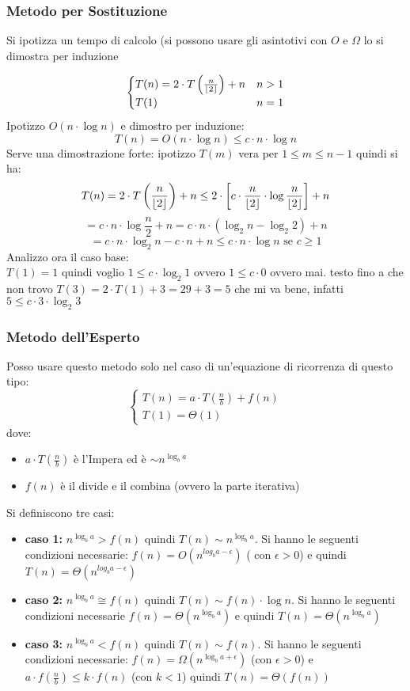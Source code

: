 \documentclass[a4paper,12pt,oneside,tikz]{book}
\DeclarePairedDelimiter\floor{\lfloor}{\rfloor}
\begin{document}
\subsubsection{Metodo per Sostituzione}
Si ipotizza un tempo di calcolo (si possono usare gli asintotivi con $O$ e $\Omega$ lo si dimostra per induzione
\begin{esempio}
	$$\begin{cases}
			T(n)=2\cdot T\left(\frac{n}{\floor{2}}\right)+n & n>1 \\
			T(1)                                            & n=1
		\end{cases}
	$$
	Ipotizzo $O(n\cdot \log n)$ e dimostro per induzione:
	$$T(n)=O(n\cdot \log n)\leq c\cdot n\cdot \log n$$
	Serve una dimostrazione forte:
	ipotizzo $T(m)$ vera per $1\leq m\leq n-1$ quindi si ha:
	$$T(n)=2\cdot T\left(\frac{n}{\floor{2}}\right)+n\leq 2\cdot\left[c\cdot \frac{n}{\floor{2}}\cdot \log \frac{n}{\floor{2}}\right]+n$$
	$$=c\cdot n\cdot \log \frac{n}{2}+n=c\cdot n\cdot (\log_2 n-\log_2 2)+n$$
	$$=c\cdot n\cdot \log_2 n-c\cdot n+n\leq c\cdot n\cdot \log n \mbox{ se } c\geq 1$$
	\newpage
	Analizzo ora il caso base:\\
	$T(1)=1$ quindi voglio $1\leq c\cdot \log_2 1$ ovvero $1\leq c\cdot 0$ ovvero mai.
	testo fino a che non trovo $T(3)=2\cdot T(1)+3=29+3=5$ che mi va bene, infatti $5\leq c\cdot 3\cdot \log_2 3$
\end{esempio}
\subsubsection{Metodo dell'Esperto}
Posso usare questo metodo solo nel caso di un'equazione di ricorrenza di questo tipo:
$$\begin{cases}
		T(n)=a\cdot T\left(\frac{n}{b}\right) +f(n) \\
		T(1)=\Theta(1)
	\end{cases}$$
dove:
\begin{itemize}
	\item $a\cdot T\left(\frac{n}{b}\right)$ è l'Impera ed è $\sim n^{\log_b a}$
	\item $f(n)$ è il divide e il combina (ovvero la parte iterativa)
\end{itemize}
Si definiscono tre casi:
\begin{itemize}
	\item \textbf{caso 1:} $n^{\log_b a}>f(n)$ quindi $T(n)\sim n^{\log_b a}$. Si hanno le seguenti condizioni necessarie: $f(n)=O(n^{log_b a -\epsilon})$ ( con $\epsilon>0$) e quindi $T(n)=\Theta(n^{log_b a -\epsilon})$
	\item \textbf{caso 2:} $n^{\log_b a}\cong f(n)$ quindi $T(n)\sim f(n)\cdot \log n$. Si hanno le seguenti condizioni necessarie $f(n)=\Theta(n^{\log_b a})$ e quindi $T(n)=\Theta(n^{\log_b a})$
	\item \textbf{caso 3:} $n^{\log_b a}< f(n)$ quindi $T(n)\sim f(n)$. Si hanno le seguenti condizioni necessarie: $f(n)=\Omega(n^{\log_b a +\epsilon})$ (con $\epsilon>0$) e $a\cdot f\left(\frac{n}{b}
		      \right)\leq k\cdot f(n)$ (con $k<1$) quindi $T(n)=\Theta(f(n))$
\end{itemize}
\end{document}
